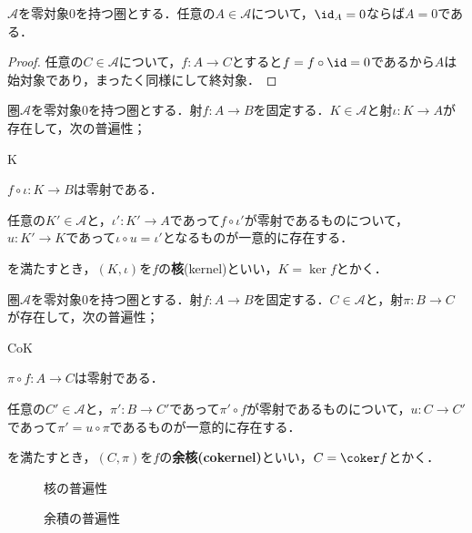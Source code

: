\begin{cor}
	$\mathscr{A}$を零対象$0$を持つ圏とする．任意の$A\in\mathscr{A}$について，$\id_A =0$ならば$A=0$である．
\end{cor}

\begin{proof}
	任意の$C\in\mathscr{A}$について，$f:A\to C$とすると$f=f\circ\id=0$であるから$A$は始対象であり，まったく同様にして終対象．
\end{proof}

\begin{defi}[射の核]
	圏$\mathscr{A}$を零対象$0$を持つ圏とする．射$f:A\to B$を固定する．$K\in\mathscr{A}$と射$\iota:K\to A$が存在して，次の普遍性；
	\begin{defiterm}{K}
		\item $f\circ\iota:K\to B$は零射である．
		\item 任意の$K'\in\mathscr{A}$と，$\iota':K'\to A$であって$f\circ\iota'$が零射であるものについて，$u:K'\to K$であって$\iota\circ u=\iota'$となるものが一意的に存在する．
	\end{defiterm}
	を満たすとき，$(K,\iota)$を$f$の\textbf{核}(kernel)といい，$K=\ker f$とかく．
\end{defi}

\begin{defi}[射の余核]
	圏$\mathscr{A}$を零対象$0$を持つ圏とする．射$f:A\to B$を固定する．$C\in\mathscr{A}$と，射$\pi:B\to C$が存在して，次の普遍性；
	\begin{defiterm}{CoK}
		\item $\pi\circ f:A\to C$は零射である．
		\item 任意の$C'\in\mathscr{A}$と，$\pi':B\to C'$であって$\pi'\circ f$が零射であるものについて，$u:C\to C'$であって$\pi'=u\circ\pi$であるものが一意的に存在する．
	\end{defiterm}
	を満たすとき，$(C,\pi)$を$f$の\textbf{余核(cokernel)}といい，$C=\coker f$とかく．
\end{defi}

\begin{minipage}{.45\textwidth}
	\begin{figure}[H]
		\centering
		\caption{核の普遍性}
	\end{figure}
\end{minipage}
\hfill
\begin{minipage}{.45\textwidth}
	\begin{figure}[H]
		\centering
		\caption{余積の普遍性}
	\end{figure}
\end{minipage}

